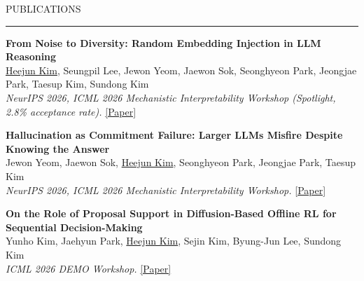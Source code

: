 \documentclass{resume} %
\renewenvironment{rSection}[1]{
\vspace{-0.5 em} %
\sectionskip
\textcolor{RoyalPurple}{\MakeUppercase{#1}}
\sectionlineskip
\hrule
\begin{list}{}{
\setlength{\leftmargin}{1.5em}
}
\item[]
}{
\end{list}
}
\begin{document}
\begin{rSection}{Publications}

\textbf{From Noise to Diversity: Random Embedding Injection in LLM Reasoning} \\
{\small \underline{Heejun Kim}, Seungpil Lee, Jewon Yeom, Jaewon Sok, Seonghyeon Park, Jeongjae Park, Taesup Kim, Sundong Kim} \\
{\small \em NeurIPS 2026, \em ICML 2026 Mechanistic Interpretability Workshop (Spotlight, 2.8\% acceptance rate).} \href{https://arxiv.org/abs/2605.11936}{\small [Paper]}

\vspace{0.1em}

\textbf{Hallucination as Commitment Failure: Larger LLMs Misfire Despite Knowing the Answer} \\
{\small Jewon Yeom, Jaewon Sok, \underline{Heejun Kim}, Seonghyeon Park, Jeongjae Park, Taesup Kim} \\
{\small \em NeurIPS 2026, \em ICML 2026 Mechanistic Interpretability Workshop.} \href{https://arxiv.org/abs/2605.22007}{\small [Paper]}

\vspace{0.1em}

\textbf{On the Role of Proposal Support in Diffusion-Based Offline RL for Sequential Decision-Making} \\
{\small Yunho Kim, Jaehyun Park, \underline{Heejun Kim}, Sejin Kim, Byung-Jun Lee, Sundong Kim} \\
{\small \em ICML 2026 DEMO Workshop.} \href{https://openreview.net/forum?id=roLdW7qeCO}{\small [Paper]}

%
%
%
%
%

\end{rSection}
\end{document}
